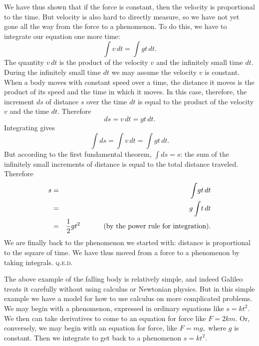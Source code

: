 \documentclass[polutonikogreek,english,twoside,openright]{article}
\begin{document}
We have thus shown that if the force is constant, then the velocity is
proportional to the time.  But velocity is also hard to directly
measure, so we have not yet gone all the way from the force to a
phenomenon.  To do this, we have to integrate our equation one more
time:
$$\int\!v \,dt = \int\!gt\,dt.$$
The quantity $v\,dt$ is the product of the velocity $v$ and the infinitely small time $dt$.  During the infinitely small time $dt$ we may assume the velocity $v$ is constant.  When a body moves with constant speed over a time, the distance it moves is the product of its speed and the time in which it moves.  In this case, therefore, the increment $ds$ of distance $s$ over the time $dt$ is equal to the product of the velocity $v$ and the time $dt$.  Therefore
$$ds = v\,dt = gt\,dt.$$
Integrating gives
$$\int\!ds = \int\!v\,dt = \int\! gt\,dt.$$
But according to the first fundamental theorem, $\int\!ds = s$: the sum of the infinitely small increments of distance is equal to the total distance traveled.
Therefore
\begin{eqnarray*}
  s & = & \int \!gt\,dt\\
    & = & g\int\!t\,dt\\
    & = & \frac{1}{2}gt^2 \mbox{\hspace{3em} (by the power rule for integration).}
\end{eqnarray*}
We are finally back to the phenomenon we started with: distance is
proportional to the square of time.  We have thus moved from a force
to a phenomenon by taking integrals. \textsc{q.e.d.} \vspace{2ex}

The above example of the falling body is relatively simple, and indeed
Galileo treats it carefully without using calculus or Newtonian
physics.  But in this simple example we have a model for how to use
calculus on more complicated problems.  We may begin with a
phenomenon, expressed in ordinary equations like $s = kt^2$.  We then
can take derivatives to come to an equation for force like $F = 2km$.
Or, conversely, we may begin with an equation for force, like $F= mg,$
where $g$ is constant.  Then we integrate to get back to a phenomenon
$s= kt^2$.\vspace{2ex}
\end{document}
